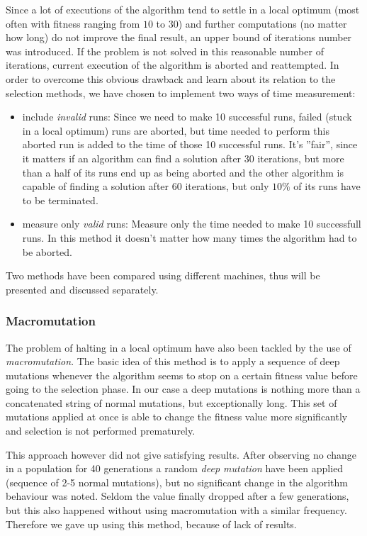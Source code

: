 \documentclass[a4paper]{article}
\begin{document}
Since a lot of executions of the algorithm tend to settle in a local optimum (most often with fitness ranging from $10$ to $30$)
and further computations (no matter how long) do not improve the final result, an upper bound of iterations number was introduced.
If the problem is not solved in this reasonable number of iterations, current execution of the algorithm is aborted and reattempted.
In order to overcome this obvious drawback and learn about its relation to the selection methods, we have chosen to implement two ways of time measurement:
\begin{itemize}
	\item	include \textit{invalid} runs: Since we need to make 10 successful runs, failed (stuck in a local optimum) runs are aborted,
			but time needed to perform this aborted run is added to the time of those 10 successful runs. It's ''fair'', since it matters if
			an algorithm can find a solution after 30 iterations, but more than a half of its runs end up as being aborted and the other algorithm
			is capable of finding a solution after 60 iterations, but only $10\%$ of its runs have to be terminated.
	\item measure only \textit{valid} runs: Measure only the time needed to make 10 successfull runs. In this method it doesn't matter how many times the algorithm had to be aborted.
\end{itemize}

Two methods have been compared using different machines, thus will be presented and discussed separately.

\subsubsection{Macromutation}

The problem of halting in a local optimum have also been tackled by the use of \textit{macromutation}. The basic idea of this method is to apply a sequence of deep mutations whenever the algorithm seems to stop on a certain fitness value before going to the selection phase. In our case a deep mutations is nothing more than a concatenated string of normal mutations, but exceptionally long. This set of mutations applied at once is able to change the fitness value more significantly and selection
is not performed prematurely.

This approach however did not give satisfying results. After observing no change in a population for 40 generations a random \textit{deep mutation} have been applied (sequence of 2-5 normal mutations), but no significant change in the algorithm behaviour was noted. Seldom the value finally dropped after a few generations, but this also happened without using macromutation with a similar frequency. Therefore we gave up using this method, because of lack of results.
\end{document}
